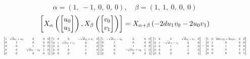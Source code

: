 \documentclass[11pt]{article}
\theoremstyle{definition}
\begin{document}
\[
\alpha = \left( 1, \  -1, \  0, \  0, \  0\right), \quad \beta = \left( 1, \  1, \  0, \  0, \  0\right)
\]
\[
\scaletoalign{\textwidth}{\left[ X_{\alpha}\left(\left[\begin{matrix}u_{0}\\u_{1}\end{matrix}\right]\right), X_{\beta}\left(\left[\begin{matrix}v_{0}\\v_{1}\end{matrix}\right]\right) \right] = X_{\alpha + \beta}\left(- 2 d u_{1} v_{0} - 2 u_{0} v_{1}\right)}
\]
\[
\scaletoalign{\textwidth}{{\left[\begin{matrix}1 & \sqrt{d} u_{1} + u_{0} & 0 & 0 & 0\\0 & 1 & 0 & 0 & 0\\0 & 0 & 1 & 0 & 0\\0 & 0 & \sqrt{d} u_{1} - u_{0} & 1 & 0\\0 & 0 & 0 & 0 & 1\end{matrix}\right]} {\left[\begin{matrix}1 & 0 & 0 & - \sqrt{d} v_{0} + v_{1} & 0\\0 & 1 & \sqrt{d} v_{0} + v_{1} & 0 & 0\\0 & 0 & 1 & 0 & 0\\0 & 0 & 0 & 1 & 0\\0 & 0 & 0 & 0 & 1\end{matrix}\right]} {\left[\begin{matrix}1 & - \sqrt{d} u_{1} - u_{0} & 0 & 0 & 0\\0 & 1 & 0 & 0 & 0\\0 & 0 & 1 & 0 & 0\\0 & 0 & - \sqrt{d} u_{1} + u_{0} & 1 & 0\\0 & 0 & 0 & 0 & 1\end{matrix}\right]} {\left[\begin{matrix}1 & 0 & 0 & \sqrt{d} v_{0} - v_{1} & 0\\0 & 1 & - \sqrt{d} v_{0} - v_{1} & 0 & 0\\0 & 0 & 1 & 0 & 0\\0 & 0 & 0 & 1 & 0\\0 & 0 & 0 & 0 & 1\end{matrix}\right]} = {\left[\begin{matrix}1 & 0 & 2 d u_{1} v_{0} + 2 u_{0} v_{1} & 0 & 0\\0 & 1 & 0 & 0 & 0\\0 & 0 & 1 & 0 & 0\\0 & 0 & 0 & 1 & 0\\0 & 0 & 0 & 0 & 1\end{matrix}\right]}}
\]
\end{document}
